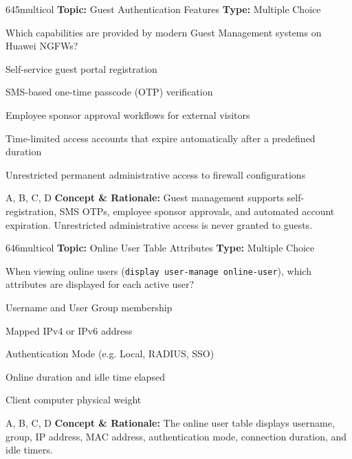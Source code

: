 \begin{qcard}{645}{multicol}
\textcolor{darkslate!75}{\small\textbf{Topic:} Guest Authentication Features \hfill \textbf{Type:} Multiple Choice}\vspace{0.4em}\par
Which capabilities are provided by modern Guest Management systems on Huawei NGFWs?
\begin{qoptions}
\item Self-service guest portal registration
\item SMS-based one-time passcode (OTP) verification
\item Employee sponsor approval workflows for external visitors
\item Time-limited access accounts that expire automatically after a predefined duration
\item Unrestricted permanent administrative access to firewall configurations
\end{qoptions}
\end{qcard}
\nopagebreak
\begin{explainbox}{A, B, C, D}
\textbf{Concept \& Rationale:} Guest management supports self-registration, SMS OTPs, employee sponsor approvals, and automated account expiration. Unrestricted administrative access is never granted to guests.
\end{explainbox}

\begin{qcard}{646}{multicol}
\textcolor{darkslate!75}{\small\textbf{Topic:} Online User Table Attributes \hfill \textbf{Type:} Multiple Choice}\vspace{0.4em}\par
When viewing online users (\texttt{display user-manage online-user}), which attributes are displayed for each active user?
\begin{qoptions}
\item Username and User Group membership
\item Mapped IPv4 or IPv6 address
\item Authentication Mode (e.g. Local, RADIUS, SSO)
\item Online duration and idle time elapsed
\item Client computer physical weight
\end{qoptions}
\end{qcard}
\nopagebreak
\begin{explainbox}{A, B, C, D}
\textbf{Concept \& Rationale:} The online user table displays username, group, IP address, MAC address, authentication mode, connection duration, and idle timers.
\end{explainbox}


